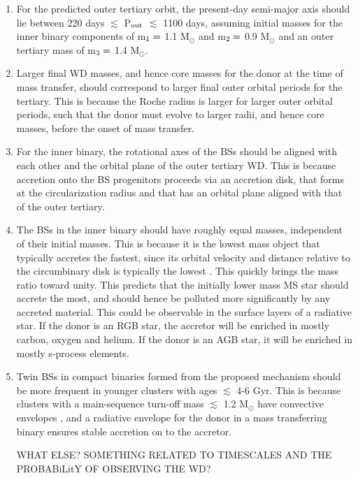 \documentclass{aastex62}
\begin{document}
\begin{enumerate}

\item For the predicted outer tertiary orbit, the present-day semi-major axis should lie between 220 days $\lesssim$ P$_{\rm out}$ $\lesssim$ 1100 days, assuming initial masses for the inner binary components of m$_{\rm 1} =$ 1.1 M$_{\odot}$ and m$_{\rm 2} =$ 0.9 M$_{\odot}$ and an outer tertiary mass of m$_{\rm 3} =$ 1.4 M$_{\odot}$.

\item Larger final WD masses, and hence core masses for the donor at the time of mass transfer, should correspond to larger final outer orbital periods for the tertiary.  This is because the Roche radius is larger for larger outer orbital periods, such that the donor must evolve to larger radii, and hence core masses, before the onset of mass transfer.

\item For the inner binary, the rotational axes of the BSs should be aligned with each other and the orbital plane of the outer tertiary WD.  This is because accretion onto the BS progenitors proceeds via an accretion disk, that forms at the circularization radius and that has an orbital plane aligned with that of the outer tertiary.

\item The BSs in the inner binary should have roughly equal masses, independent of their initial masses.  This is because it is the lowest mass object that typically accretes the fastest, since its orbital velocity and distance relative to the circumbinary disk is typically the lowest \citep[e.g.][]{haiman09,farris15,rafikov16,kelley17}.  This quickly brings the mass ratio toward unity.  This predicts that the initially lower mass MS star should accrete the most, and should hence be polluted more significantly by any accreted material.  This could be observable in the surface layers of a radiative star.  If the donor is an RGB star, the accretor will be enriched in mostly carbon, oxygen and helium.  If the donor is an AGB star, it will be enriched in mostly s-process elements.

\item Twin BSs in compact binaries formed from the proposed mechanism should be more frequent in younger clusters with ages $\lesssim$ 4-6 Gyr.  This is because clusters with a main-sequence turn-off mass $\lesssim$ 1.2 M$_{\odot}$ have convective envelopes \citep[e.g.][]{iben91,maedoer09}, and a radiative envelope for the donor in a mass transferring binary ensures stable accretion on to the accretor.

WHAT ELSE?  SOMETHING RELATED TO TIMESCALES AND THE PROBABiLitY OF OBSERVING THE WD?

\end{enumerate}
\end{document}

